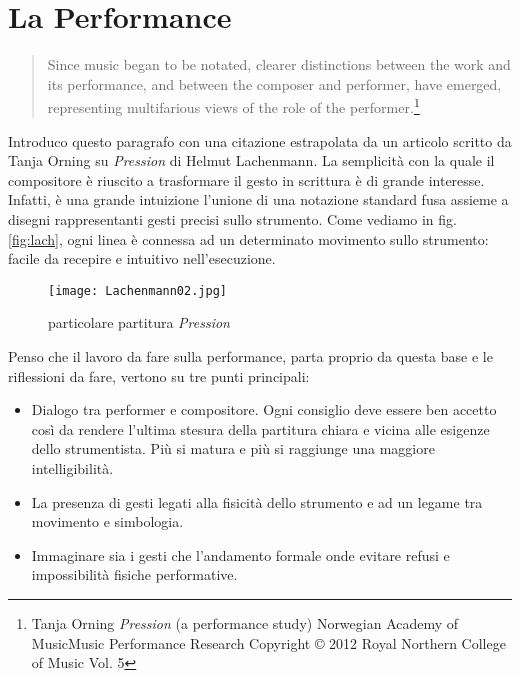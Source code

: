 
\chapter{La Performance}
\label{chp:La Performance}

\begin{quotation}
Since music began to be notated, clearer distinctions between the work and its performance, and between the composer and performer, have emerged, representing multifarious views of the role of the performer.\footnote{Tanja Orning \textit{Pression} (a performance study) Norwegian Academy of MusicMusic Performance Research Copyright © 2012 Royal Northern College of Music Vol. 5}
\end{quotation}

Introduco questo paragrafo con una citazione estrapolata da un articolo scritto da Tanja Orning su \textit{Pression} di Helmut Lachenmann. La semplicità con la quale il compositore è riuscito a trasformare il gesto in scrittura è di grande interesse. Infatti, è una grande intuizione l'unione di una notazione standard fusa assieme a disegni rappresentanti gesti precisi sullo strumento. Come vediamo in fig. \ref{fig:lach}, ogni linea è connessa ad un determinato movimento sullo strumento: facile da recepire e intuitivo nell'esecuzione. 

\begin{figure}[htbp]
\begin{center}
\texttt{[image: Lachenmann02.jpg]}
\caption{particolare partitura \textit{Pression}}
\label{fig:lach02}
\end{center}
\end{figure}

Penso che il lavoro da fare sulla performance, parta proprio da questa base e le riflessioni da fare, vertono su tre punti principali:

\begin{itemize}
\item{Dialogo tra performer e compositore. Ogni consiglio deve essere ben accetto così da rendere l'ultima stesura della partitura chiara e vicina alle esigenze dello strumentista. Più si matura e più si raggiunge una maggiore intelligibilità.}
\item{La presenza di gesti legati alla fisicità dello strumento e ad un legame tra movimento e simbologia.}
\item{Immaginare sia i gesti che l'andamento formale onde evitare refusi e impossibilità fisiche performative.}
\end{itemize}

